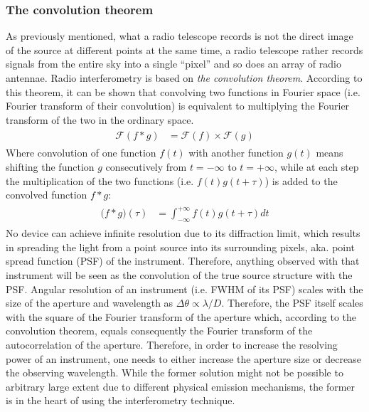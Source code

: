 \documentclass[paper=a4, fontsize=11pt]{scrartcl} %
\numberwithin{equation}{section} %
\numberwithin{figure}{section} %
\numberwithin{table}{section} %
\begin{document}
\subsubsection*{The convolution theorem}
As previously mentioned, what a radio telescope records is not the direct image of the source at different points at the same time, a radio telescope rather records signals from the entire sky into a single ``pixel'' and so does an array of radio antennae. Radio interferometry is based on \emph{the convolution theorem}. According to this theorem, it can be shown that convolving two functions in Fourier space (i.e. Fourier transform of their convolution) is equivalent to multiplying the Fourier transform of the two in the ordinary space.
\begin{align} 
\begin{split}
\mathcal{F}(f*g) &= \mathcal{F}(f) \times \mathcal{F}(g)
\end{split}                    
\end{align}
Where convolution of one function $f(t)$ with another function $g(t)$ means shifting the function $g$ consecutively from $t=-\infty$ to $t=+\infty$, while at each step the multiplication of the two functions (i.e. $f(t)g(t+\tau)$) is added to the convolved function $f*g$:
\begin{align} 
\begin{split}
\mathcal (f*g)(\tau) &= \int_{-\infty}^{+\infty} f(t)g(t+\tau) dt
\end{split}                    
\end{align}
No device can achieve infinite resolution due to its diffraction limit, which results in spreading the light from a point source into its surrounding pixels, aka. point spread function (PSF) of the instrument. Therefore, anything observed with that instrument will be seen as the convolution of the true source structure with the PSF. Angular resolution of an instrument (i.e. FWHM of its PSF) scales with the size of the aperture and wavelength as $\Delta\theta \propto \lambda / D$. Therefore, the PSF itself scales with the square of the Fourier transform of the aperture which, according to the convolution theorem, equals consequently the Fourier transform of the autocorrelation of the aperture. Therefore, in order to increase the resolving power of an instrument, one needs to either increase the aperture size or decrease the observing wavelength. While the former solution might not be possible to arbitrary large extent due to different physical emission mechanisms, the former is in the heart of using the interferometry technique.    
 
\end{document}
